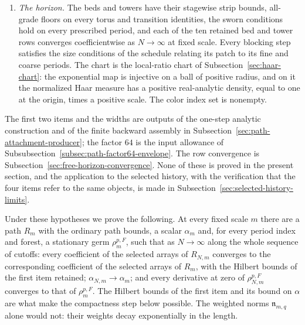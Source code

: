 \begin{enumerate}
the paid path width.
\item \emph{The horizon.} The beds and towers have their stagewise
strip bounds, all-grade floors on every torus and transition
identities, the sworn conditions hold on every prescribed period,
and each of the ten retained bed and tower rows converges
coefficientwise as $N\to\infty$ at fixed scale. Every blocking step
satisfies the size conditions of the schedule relating its patch to
its fine and coarse periods. The chart is the local-ratio chart of
Subsection~\ref{sec:haar-chart}: the exponential map is injective on a
ball of positive radius, and on it the normalized Haar measure has a
positive real-analytic density, equal to one at the origin, times a
positive scale. The color index set is nonempty.
\end{enumerate}
The first two items and the widths are outputs of the one-step
analytic construction and of the finite backward assembly in
Subsection~\ref{sec:path-attachment-producer}; the factor $64$ is the
input allowance of Subsubsection~\ref{subsec:path-factor64-envelope}. The
row convergence is Subsection~\ref{sec:free-horizon-convergence}. None of
these is proved in the present section, and the application to the
selected history, with the verification that the four items refer to
the same objects, is made in Subsection~\ref{sec:selected-history-limits}.

Under these hypotheses we prove the following. At every fixed scale
$m$ there are a path $R_m$ with the ordinary path bounds, a scalar
$\alpha_m$ and, for every period index and forest, a stationary germ
$\rho^{p,F}_m$, such that as $N\to\infty$ along the whole sequence of
cutoffs: every coefficient of the selected arrays of $R_{N,m}$
converges to the corresponding coefficient of the selected arrays of
$R_m$, with the Hilbert bounds of the first item retained;
$\alpha_{N,m}\to\alpha_m$; and every derivative at zero of
$\rho^{p,F}_{N,m}$ converges to that of $\rho^{p,F}_m$.
The Hilbert bounds of the first item and its bound on $\alpha$ are
what make the compactness step below possible. The weighted norms
$\mathfrak n_{m,q}$ alone would not: their weights decay
exponentially in the length.


